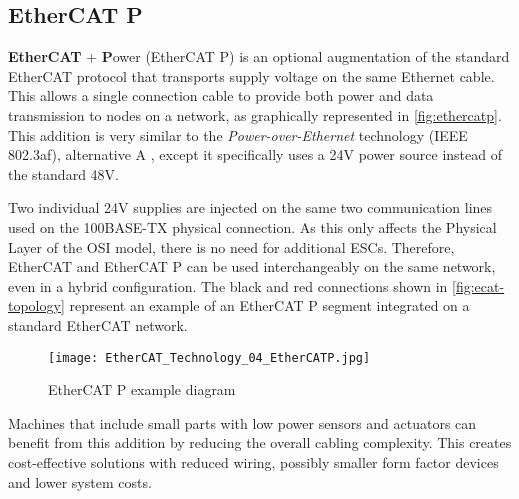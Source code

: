 \subsection{EtherCAT P}

\textbf{EtherCAT} + \textbf Power (EtherCAT P) is an optional augmentation of the standard EtherCAT protocol that transports supply voltage on the same Ethernet cable.
This allows a single connection cable to provide both power and data transmission to nodes on a network, as graphically represented in \autoref{fig:ethercatp}.
This addition is very similar to the \emph{Power-over-Ethernet} technology (IEEE 802.3af), alternative A \cite{technology:poe}, except it specifically uses a 24V power source instead of the standard 48V.

Two individual 24V supplies are injected on the same two communication lines used on the 100BASE-TX \cite{technology:poe} physical connection.
As this only affects the Physical Layer of the OSI model, there is no need for additional ESCs.
Therefore, EtherCAT and EtherCAT P can be used interchangeably on the same network, even in a hybrid configuration.
The black and red connections shown in \autoref{fig:ecat-topology} represent an example of an EtherCAT P segment integrated on a standard EtherCAT network.

\begin{figure}[t]
	\centering
	\texttt{[image: EtherCAT\_Technology\_04\_EtherCATP.jpg]}
	\caption{EtherCAT P example diagram \cite{protocol:ethercat}}
	\label{fig:ethercatp}
\end{figure}

Machines that include small parts with low power sensors and actuators can benefit from this addition by reducing the overall cabling complexity.
This creates cost-effective solutions with reduced wiring, possibly smaller form factor devices and lower system costs.
